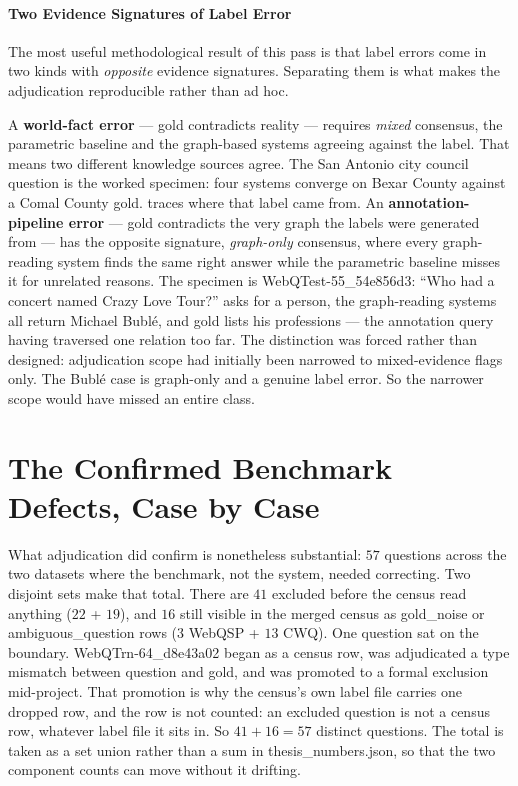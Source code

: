 \paragraph{Two Evidence Signatures of Label
Error}\label{sec:evidence-signatures}

The most useful methodological result of this pass is that label errors come in
two kinds with \emph{opposite} evidence signatures. Separating them is what
makes the adjudication reproducible rather than ad hoc.

A \textbf{world-fact error} --- gold contradicts reality --- requires
\emph{mixed} consensus, the parametric baseline and the graph-based systems
agreeing against the label. That means two different knowledge sources agree.
The San Antonio city council question is the worked specimen: four systems
converge on Bexar County against a Comal County gold. 
traces where that label came from. An
\textbf{annotation-pipeline error} --- gold contradicts the very graph the
labels were generated from --- has the opposite signature, \emph{graph-only}
consensus, where every graph-reading system finds the same right answer while
the parametric baseline misses it for unrelated reasons. The specimen is
\textsf{WebQTest-55\_54e856d3}: ``Who had a concert named Crazy Love Tour?''
asks for a person, the graph-reading systems all return Michael Bublé, and gold
lists his professions --- the annotation query having traversed one relation too
far. The distinction was forced rather than designed: adjudication scope had
initially been narrowed to mixed-evidence flags only. The Bublé case is
graph-only and a genuine label error. So the narrower scope would have missed an
entire class.


\section{The Confirmed Benchmark Defects, Case by Case}\label{app:defects}

What adjudication did confirm is nonetheless substantial: $57$ questions across
the two datasets where the benchmark, not the system, needed correcting. Two
disjoint sets make that total. There are $41$ excluded before the census read
anything ($22$ + $19$), and $16$ still visible in the merged census as
\textsf{gold\_noise} or \textsf{ambiguous\_question} rows ($3$ WebQSP + $13$
CWQ). One question sat on the boundary. \textsf{WebQTrn-64\_d8e43a02} began as
a census row, was adjudicated a type mismatch between question and gold, and
was promoted to a formal exclusion mid-project. That promotion is why the
census's own label file carries one dropped row, and the row is not counted:
an excluded question is not a census row, whatever label file it sits in. So
$41 + 16 = 57$ distinct questions. The total is taken as a set union rather
than a sum in \textsf{thesis\_numbers.json}, so that the two component counts
can move without it drifting.


